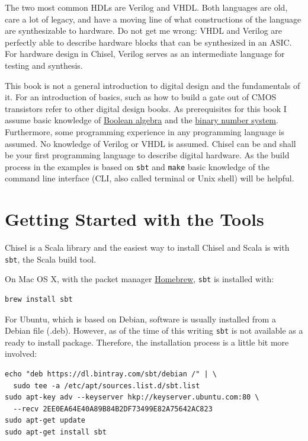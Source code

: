 \documentclass[%
    11pt, %
    headinclude, footexclude,
    openright, %
    notitlepage,
    cleardoubleempty,
    headsepline,
    pointlessnumbers,
    bibtotoc, idxtotoc,
    ]{scrbook}
\newcommand{\code}[1]{{\small{\texttt{#1}}}}
\begin{document}
The two most common HDLs are Verilog and VHDL. Both languages are old,
care a lot of legacy, and have a moving line of what constructions of the language
are synthesizable to hardware.
Do not get me wrong: VHDL and Verilog are perfectly able to describe hardware
blocks that can be synthesized in an ASIC.
For hardware design in Chisel, Verilog serves as an intermediate language
for testing and synthesis.

This book is not a general introduction to digital design and the fundamentals of it.
For an introduction of basics, such as how to build a gate out of CMOS transistors
refer to other digital design books.
As prerequisites for this book I assume basic knowledge of
\href{https://en.wikipedia.org/wiki/Boolean_algebra}{Boolean algebra} and the
\href{https://en.wikipedia.org/wiki/Binary_number}{binary number system}.
Furthermore, some programming experience in any programming language
is assumed. No knowledge of Verilog or VHDL is assumed.
Chisel can be and shall be your first programming language to describe digital hardware.
As the build process in the examples is based on \code{sbt} and \code{make}
basic knowledge of the command line interface (CLI, also called terminal or
Unix shell) will be helpful.

\section{Getting Started with the Tools}

Chisel is a Scala library and the easiest way to install Chisel and Scala is
with \code{sbt}, the Scala build tool.

On Mac OS X, with the packet manager \href{https://brew.sh/}{Homebrew},
\code{sbt} is installed with:

\begin{verbatim}
brew install sbt
\end{verbatim}

For Ubuntu, which is based on Debian, software is usually installed from a
Debian file (.deb). However, as of the time of this writing \code{sbt} is not
available as a ready to install package. Therefore, the installation process
is a little bit more involved:
\begin{verbatim}
echo "deb https://dl.bintray.com/sbt/debian /" | \
  sudo tee -a /etc/apt/sources.list.d/sbt.list
sudo apt-key adv --keyserver hkp://keyserver.ubuntu.com:80 \
  --recv 2EE0EA64E40A89B84B2DF73499E82A75642AC823
sudo apt-get update
sudo apt-get install sbt
\end{verbatim}
\end{document}
